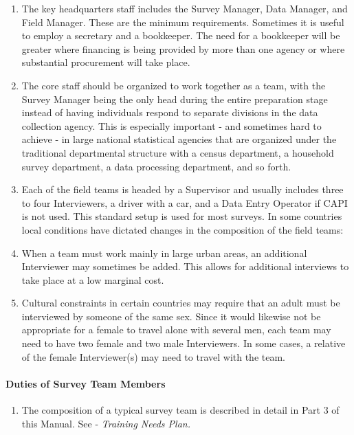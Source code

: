 \documentclass[
]{article}
\providecommand{\tightlist}{%
  \setlength{\itemsep}{0pt}\setlength{\parskip}{0pt}}
\begin{document}
\begin{enumerate}
\def\labelenumi{\arabic{enumi}.}
\setcounter{enumi}{363}
\item
  The key headquarters staff includes the Survey Manager, Data
  Manager, and Field Manager. These are the minimum requirements.
  Sometimes it is useful to employ a secretary and a bookkeeper. The
  need for a bookkeeper will be greater where financing is being
  provided by more than one agency or where substantial procurement
  will take place.
\item
  The core staff should be organized to work together as a team, with
  the Survey Manager being the only head during the entire preparation
  stage instead of having individuals respond to separate divisions in
  the data collection agency. This is especially important - and
  sometimes hard to achieve - in large national statistical agencies
  that are organized under the traditional departmental structure with
  a census department, a household survey department, a data
  processing department, and so forth.
\item
  Each of the field teams is headed by a Supervisor and usually
  includes three to four Interviewers, a driver with a car, and a Data
  Entry Operator if CAPI is not used. This standard setup is used for
  most surveys. In some countries local conditions have dictated
  changes in the composition of the field teams:
\item
  When a team must work mainly in large urban areas, an additional
  Interviewer may sometimes be added. This allows for additional
  interviews to take place at a low marginal cost.
\item
  Cultural constraints in certain countries may require that an adult
  must be interviewed by someone of the same sex. Since it would
  likewise not be appropriate for a female to travel alone with
  several men, each team may need to have two female and two male
  Interviewers. In some cases, a relative of the female Interviewer(s)
  may need to travel with the team.
\end{enumerate}

\hypertarget{duties-of-survey-team-members-1}{%
\paragraph{Duties of Survey Team Members}\label{duties-of-survey-team-members-1}}

\begin{enumerate}
\def\labelenumi{\arabic{enumi}.}
\setcounter{enumi}{368}
\tightlist
\item
  The composition of a typical survey team is described in detail in
  Part 3 of this Manual. See - \emph{Training Needs Plan.}
\end{enumerate}
\end{document}
